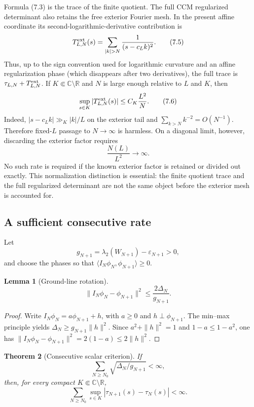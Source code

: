 \documentclass[11pt]{amsart}
\newtheorem{theorem}{Theorem}[section]
\newtheorem{lemma}[theorem]{Lemma}
\theoremstyle{definition}
\theoremstyle{remark}
\newcommand{\C}{\mathbb C}
\newcommand{\R}{\mathbb R}
\newcommand{\eps}{\varepsilon}
\begin{document}
Formula (7.3) is the trace of the finite quotient.  The full CCM
regularized determinant also retains the free exterior Fourier mesh.  In the
present affine coordinate its second-logarithmic-derivative contribution is
\[
 T^{\rm ext}_{L,N}(s)
 =\sum_{|k|>N}\frac1{(s-c_Lk)^2}.
\tag{7.5}
\]
Thus, up to the sign convention used for logarithmic curvature and an
affine regularization phase (which disappears after two derivatives), the
full trace is \(\tau_{L,N}+T^{\rm ext}_{L,N}\).  If
\(K\Subset\C\setminus\R\) and \(N\) is large enough relative to \(L\) and
\(K\), then
\[
 \sup_{s\in K}|T^{\rm ext}_{L,N}(s)|
 \le C_K\frac{L^2}{N}.
\tag{7.6}
\]
Indeed, \(|s-c_Lk|\gg_K |k|/L\) on the exterior tail and
\(\sum_{k>N}k^{-2}=O(N^{-1})\).  Therefore fixed-\(L\) passage to
\(N\to\infty\) is harmless.  On a diagonal limit, however, discarding the
exterior factor requires
\[
 \frac{N(L)}{L^2}\longrightarrow\infty.
\tag{7.7}
\]
No such rate is required if the known exterior factor is retained or
divided out exactly.  This normalization distinction is essential: the
finite quotient trace and the full regularized determinant are not the same
object before the exterior mesh is accounted for.

\subsection{A sufficient consecutive rate}

Let
\[
 g_{N+1}=\lambda_2(W_{N+1})-\eps_{N+1}>0,
\tag{7.8}
\]
and choose the phases so that
\(\langle I_N\phi_N,\phi_{N+1}\rangle\ge0\).

\begin{lemma}[Ground-line rotation]
\[
 \|I_N\phi_N-\phi_{N+1}\|^2
 \le \frac{2\Delta_N}{g_{N+1}}.
\tag{7.9}
\]
\end{lemma}

\begin{proof}
Write \(I_N\phi_N=a\phi_{N+1}+h\), with \(a\ge0\) and
\(h\perp\phi_{N+1}\).  The min--max principle yields
\(\Delta_N\ge g_{N+1}\|h\|^2\).  Since \(a^2+\|h\|^2=1\) and
\(1-a\le1-a^2\), one has
\(\|I_N\phi_N-\phi_{N+1}\|^2=2(1-a)\le2\|h\|^2\).
\end{proof}

\begin{theorem}[Consecutive scalar criterion]
If
\[
 \sum_{N\ge N_0}\sqrt{\Delta_N/g_{N+1}}<\infty,
\tag{7.10}
\]
then, for every compact \(K\Subset\C\setminus\R\),
\[
 \sum_{N\ge N_0}\sup_{s\in K}
 |\tau_{N+1}(s)-\tau_N(s)|<\infty.
\tag{7.11}
\]
\end{theorem}
\end{document}
